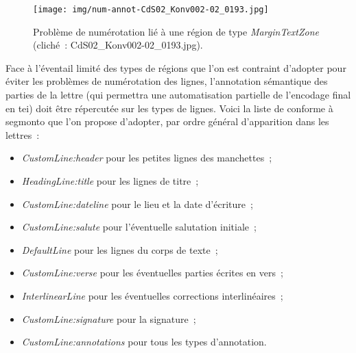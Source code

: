 \documentclass[a4paper,12pt,twoside]{book}
\begin{document}
				\begin{figure}[!h]
					\centering
					\texttt{[image: img/num-annot-CdS02\_Konv002-02\_0193.jpg]}
					\caption{Problème de numérotation lié à une région de type \textit{MarginTextZone} (cliché~: CdS02\_Konv002-02\_0193.jpg).}
					\label{num-annot-193}
				\end{figure}
				
				Face à l'éventail limité des types de régions que l'on est contraint d'adopter pour éviter les problèmes de numérotation des lignes, l'annotation sémantique des parties de la lettre (qui permettra une automatisation partielle de l'encodage final en \gls{tei}) doit être répercutée sur les types de lignes. Voici la liste de conforme à \gls{segmonto} que l'on propose d'adopter, par ordre général d'apparition dans les lettres~:
				
				\begin{itemize}
					\item \textit{CustomLine:header} pour les petites lignes des manchettes~;
					\item \textit{HeadingLine:title} pour les lignes de titre~;
					\item \textit{CustomLine:dateline} pour le lieu et la date d'écriture~;
					\item \textit{CustomLine:salute} pour l'éventuelle salutation initiale~;
					\item \textit{DefaultLine} pour les lignes du corps de texte~;
					\item \textit{CustomLine:verse} pour les éventuelles parties écrites en vers~;
					\item \textit{InterlinearLine} pour les éventuelles corrections interlinéaires~;\label{interlinear}
					\item \textit{CustomLine:signature} pour la signature~;
					\item \textit{CustomLine:annotations} pour tous les types d'annotation.
				\end{itemize}
		
\end{document}
